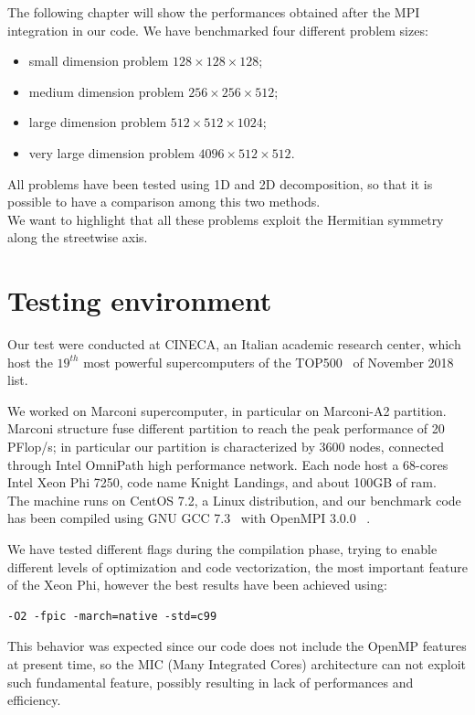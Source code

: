 The following chapter will show the performances obtained after the MPI integration in our code.
We have benchmarked four different problem sizes:
\begin{itemize}
\item small dimension problem $128\times 128 \times 128$;
\item medium dimension problem $256\times 256\times 512$;
\item large dimension problem $512\times 512\times 1024$;
\item very large dimension problem $4096\times 512\times 512$.  
\end{itemize}
All problems have been tested using 1D and 2D decomposition, so that it is possible to have a comparison among this two methods.
\\
We want to highlight that all these problems exploit the Hermitian symmetry along the streetwise axis.
\section{Testing environment}
Our test were conducted at CINECA\cite{Cineca}, an Italian academic research center, which host the $19^{th}$ most powerful supercomputers of the TOP500~\cite{top500} of November 2018 list.

We worked on Marconi\cite{marconi:specs} supercomputer, in particular on Marconi-A2 partition.
Marconi structure fuse different partition to reach the peak performance of 20 PFlop/s; in particular our partition is characterized by 3600 nodes, connected through Intel OmniPath\cite{intel:intelmpivsopenmpi} high performance network. Each node host a 68-cores Intel Xeon Phi 7250, code name Knight Landings, and about 100GB of ram. \\
The machine runs on CentOS 7.2, a Linux distribution, and our benchmark code has been compiled using GNU GCC 7.3~\cite{gcc} with OpenMPI 3.0.0~\cite{openmpi}\cite{MPI:standard3} . \\
\par
We have tested different flags during the compilation phase, trying to enable different levels of optimization and code vectorization, the most important feature of the Xeon Phi, however the best results have been achieved using:
\begin{lstlisting}
-O2 -fpic -march=native -std=c99
\end{lstlisting}
This behavior was expected since our code does not include the OpenMP\cite{openmp} features at present time, so the MIC\cite{mic} (Many Integrated Cores) architecture can not exploit such fundamental feature, possibly resulting in lack of performances and efficiency.



